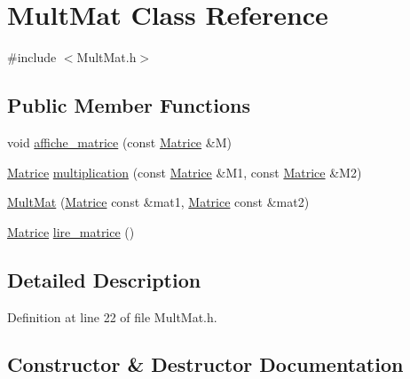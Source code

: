 \hypertarget{class_mult_mat}{}\section{Mult\+Mat Class Reference}
\label{class_mult_mat}


{\ttfamily \#include $<$Mult\+Mat.\+h$>$}

\subsection*{Public Member Functions}
\begin{DoxyCompactItemize}
\item 
void \mbox{\hyperlink{class_mult_mat_aa504768889a47b3b0b335639baa64403}{affiche\+\_\+matrice}} (const \mbox{\hyperlink{_div_mat_8h_a5cd1306cd22bb9a4a8d8b6ead3f49a08}{Matrice}} \&M)
\item 
\mbox{\hyperlink{_div_mat_8h_a5cd1306cd22bb9a4a8d8b6ead3f49a08}{Matrice}} \mbox{\hyperlink{class_mult_mat_af4fd2724c38c3c8b97c228fee10375d5}{multiplication}} (const \mbox{\hyperlink{_div_mat_8h_a5cd1306cd22bb9a4a8d8b6ead3f49a08}{Matrice}} \&M1, const \mbox{\hyperlink{_div_mat_8h_a5cd1306cd22bb9a4a8d8b6ead3f49a08}{Matrice}} \&M2)
\item 
\mbox{\hyperlink{class_mult_mat_a30f8a55b7d59db1c29f74eba10be8594}{Mult\+Mat}} (\mbox{\hyperlink{_div_mat_8h_a5cd1306cd22bb9a4a8d8b6ead3f49a08}{Matrice}} const \&mat1, \mbox{\hyperlink{_div_mat_8h_a5cd1306cd22bb9a4a8d8b6ead3f49a08}{Matrice}} const \&mat2)
\item 
\mbox{\hyperlink{_div_mat_8h_a5cd1306cd22bb9a4a8d8b6ead3f49a08}{Matrice}} \mbox{\hyperlink{class_mult_mat_a9dceb9db8ae5d70a5185970b7195e24a}{lire\+\_\+matrice}} ()
\end{DoxyCompactItemize}


\subsection{Detailed Description}


Definition at line 22 of file Mult\+Mat.\+h.



\subsection{Constructor \& Destructor Documentation}
\mbox{\label{class_mult_mat_a30f8a55b7d59db1c29f74eba10be8594}} 
